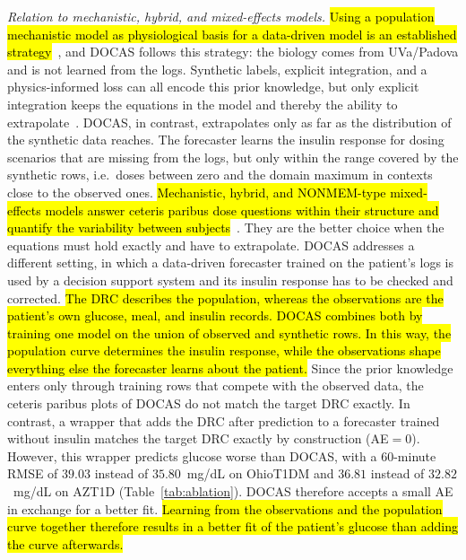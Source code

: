 \documentclass[a4paper,fleqn]{cas-sc}
\begin{document}
\textit{Relation to mechanistic, hybrid, and mixed-effects models.}
\hl{Using a population mechanistic model as physiological basis for a data-driven model is an established strategy}~\citep{froehlich2018}, and DOCAS follows this strategy: the biology comes from UVa/Padova and is not learned from the logs. Synthetic labels, explicit integration, and a physics-informed loss can all encode this prior knowledge, but only explicit integration keeps the equations in the model and thereby the ability to extrapolate~\citep{fiedler2008,samadi2022,vonstosch2014}. DOCAS, in contrast, extrapolates only as far as the distribution of the synthetic data reaches. The forecaster learns the insulin response for dosing scenarios that are missing from the logs, but only within the range covered by the synthetic rows, i.e.\ doses between zero and the domain maximum in contexts close to the observed ones. \hl{Mechanistic, hybrid, and NONMEM-type mixed-effects models answer ceteris paribus dose questions within their structure and quantify the variability between subjects}~\citep{sheiner1980,mould2012,jones2013}. They are the better choice when the equations must hold exactly and have to extrapolate. DOCAS addresses a different setting, in which a data-driven forecaster trained on the patient's logs is used by a decision support system and its insulin response has to be checked and corrected. \hl{The DRC describes the population, whereas the observations are the patient's own glucose, meal, and insulin records. DOCAS combines both by training one model on the union of observed and synthetic rows. In this way, the population curve determines the insulin response, while the observations shape everything else the forecaster learns about the patient.} Since the prior knowledge enters only through training rows that compete with the observed data, the ceteris paribus plots of DOCAS do not match the target DRC exactly. In contrast, a wrapper that adds the DRC after prediction to a forecaster trained without insulin matches the target DRC exactly by construction (AE${}=0$). However, this wrapper predicts glucose worse than DOCAS, with a 60-minute RMSE of $39.03$ instead of $35.80$~mg/dL on OhioT1DM and $36.81$ instead of $32.82$~mg/dL on AZT1D (Table~\ref{tab:ablation}). DOCAS therefore accepts a small AE in exchange for a better fit. \hl{Learning from the observations and the population curve together therefore results in a better fit of the patient's glucose than adding the curve afterwards.}
\end{document}
